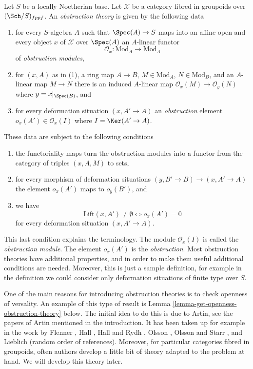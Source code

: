 \begin{definition}
\label{definition-obstruction-theory}
Let $S$ be a locally Noetherian base. Let $\mathcal{X}$ be a category fibred
in groupoids over $(\Sch/S)_{fppf}$. An {\it obstruction theory} is 
given by the following data
\begin{enumerate}
\item for every $S$-algebra $A$ such that $\Spec(A) \to S$
maps into an affine open and every object $x$ of $\mathcal{X}$ over
$\Spec(A)$ an $A$-linear functor
$$
\mathcal{O}_x : \text{Mod}_A \to \text{Mod}_A
$$
of {\it obstruction modules},
\item for $(x, A)$ as in (1), a ring map $A \to B$,
$M \in \text{Mod}_A$, $N \in \text{Mod}_B$, and an $A$-linear
map $M \to N$ there is an induced $A$-linear map $\mathcal{O}_x(M) \to \mathcal{O}_y(N)$
where $y = x|_{\Spec(B)}$, and
\item for every deformation situation $(x, A' \to A)$ an
{\it obstruction} element
$o_x(A') \in \mathcal{O}_x(I)$ where $I = \Ker(A' \to A)$.
\end{enumerate}
These data are subject to the following conditions
\begin{enumerate}
\item[(i)] the functoriality maps turn the obstruction modules into a functor
from the category of triples $(x, A, M)$ to sets,
\item[(ii)] for every morphism of deformation situations
$(y, B' \to B) \to (x, A' \to A)$ the element $o_x(A')$ maps
to $o_y(B')$, and
\item[(iii)] we have
$$
\text{Lift}(x, A') \not = \emptyset
\Leftrightarrow
o_x(A') = 0
$$
for every deformation situation $(x, A' \to A)$.
\end{enumerate}
\end{definition}

\noindent
This last condition explains the terminology. The module $\mathcal{O}_x(I)$
is called the {\it obstruction module}. The element $o_x(A')$ is the
{\it obstruction}.
Most obstruction theories have additional properties, and in order to
make them useful additional conditions are needed.
Moreover, this is just a sample definition, for example in the definition
we could consider only deformation situations of finite type over $S$.

\medskip\noindent
One of the main reasons for introducing obstruction theories is to check
openness of versality. An example of this type of result is
Lemma \ref{lemma-get-openness-obstruction-theory} below.
The initial idea to do this is due to Artin, see
the papers of Artin mentioned in the introduction. It has been taken up
for example in the work by Flenner \cite{Flenner},
Hall \cite{Hall-coherent},
Hall and Rydh \cite{rydh_axioms},
Olsson \cite{olsson_deformation},
Olsson and Starr \cite{olsson-starr}, and
Lieblich \cite{lieblich-complexes} (random order of references).
Moreover, for particular categories fibred in groupoids, often
authors develop a little bit of theory adapted to the problem at hand.
We will develop this theory later.

